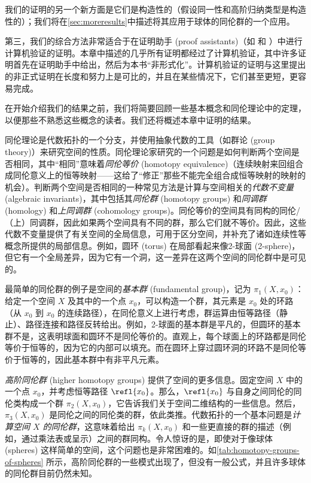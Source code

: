 %
我们的证明的另一个新方面是它们是构造性的（假设同一性和高阶归纳类型是构造性的）；我们将在\cref{sec:moreresults}中描述将其应用于球体的同伦群的一个应用。

%
%
第三，我们的综合方法非常适合于在证明助手 (proof assistants)（如 \Coq 和 \Agda）中进行计算机验证的证明。本章中描述的几乎所有证明都经过了计算机验证，其中许多证明首先在证明助手中给出，然后为本书“非形式化”。计算机验证的证明与这里提出的非正式证明在长度和努力上是可比的，并且在某些情况下，它们甚至更短，更容易完成。

\mentalpause

在开始介绍我们的结果之前，我们将简要回顾一些基本概念和同伦理论中的定理，以便那些不熟悉这些概念的读者。我们还将概述本章中证明的结果。

%
同伦理论是代数拓扑的一个分支，并使用抽象代数的工具（如群论 (group theory)）来研究空间的性质。同伦理论家研究的一个问题是如何判断两个空间是否相同，其中“相同”意味着\emph{同伦等价} (homotopy equivalence)（连续映射来回组合成同伦意义上的恒等映射——这给了“修正”那些不能完全组合成恒等映射的映射的机会）。判断两个空间是否相同的一种常见方法是计算与空间相关的\emph{代数不变量} (algebraic invariants)，其中包括其\emph{同伦群} (homotopy groups) 和\emph{同调群} (homology) 和\emph{上同调群} (cohomology groups)。同伦等价的空间具有同构的同伦/（上）同调群，因此如果两个空间具有不同的群，那么它们就不等价。因此，这些代数不变量提供了有关空间的全局信息，可用于区分空间，并补充了诸如连续性等概念所提供的局部信息。例如，圆环 (torus) 在局部看起来像2-球面 (2-sphere)，但它有一个全局差异，因为它有一个洞，这一差异在这两个空间的同伦群中是可见的。

最简单的同伦群的例子是空间的\emph{基本群} (fundamental group)，记为 $\pi_1(X,x_0)$：给定一个空间 $X$ 及其中的一个点 $x_0$，可以构造一个群，其元素是 $x_0$ 处的环路（从 $x_0$ 到 $x_0$ 的连续路径），在同伦意义上进行考虑，群运算由恒等路径（静止）、路径连接和路径反转给出。例如，2-球面的基本群是平凡的，但圆环的基本群不是，这表明球面和圆环不是同伦等价的。直观上，每个球面上的环路都是同伦等价于恒等的，因为它的内部可以填充。而在圆环上穿过圆环洞的环路不是同伦等价于恒等的，因此基本群中有非平凡元素。

\emph{高阶同伦群} (higher homotopy groups) 提供了空间的更多信息。固定空间 $X$ 中的一个点 $x_0$，并考虑恒等路径 $\refl{x_0}$。那么，$\refl{x_0}$ 与自身之间同伦的同伦类构成一个群 $\pi_2(X,x_0)$，它告诉我们关于空间二维结构的一些信息。然后，$\pi_3(X,x_0)$ 是同伦之间的同伦类的群，依此类推。代数拓扑的一个基本问题是\emph{计算空间 $X$ 的同伦群}，这意味着给出 $\pi_k(X,x_0)$ 和一些更直接的群的描述（例如，通过乘法表或呈示）之间的群同构。令人惊讶的是，即使对于像球体 (spheres) 这样简单的空间，这个问题也是非常困难的。如\cref{tab:homotopy-groups-of-spheres} 所示，高阶同伦群的一些模式出现了，但没有一般公式，并且许多球体的同伦群目前仍然未知。


